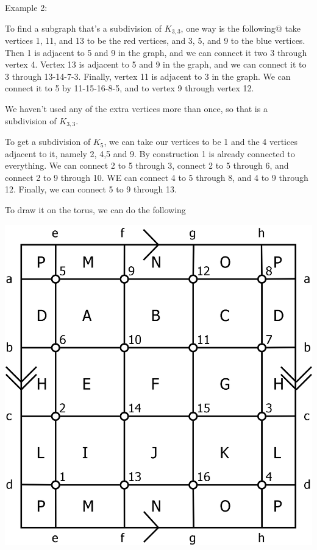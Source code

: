 \documentclass{amsart}
\begin{document}
Example 2:


To find a subgraph that's a subdivision of $K_{3,3}$, one way is the following@ take vertices 1, 11, and 13 to be the red vertices, and 3, 5, and 9 to the blue vertices.  Then 1 is adjacent to 5 and 9 in the graph, and we can connect it two 3 through vertex 4.  Vertex 13 is adjacent to 5 and 9 in the graph, and we can connect it to 3 through 13-14-7-3.  Finally, vertex 11 is adjacent to 3 in the graph.  We can connect it to 5 by 11-15-16-8-5, and to vertex 9 through vertex 12.

We haven't used any of the extra vertices more than once, so that is a subdivision of $K_{3,3}$.

To get a subdivision of $K_5$, we can take our vertices to be 1 and the 4 vertices adjacent to it, namely 2, 4,5 and 9.  By construction 1 is already connected to everything.  We can connect 2 to 5 through 3, connect 2 to 5 through 6, and connect 2 to 9 through 10.  WE can connect 4 to 5 through 8, and 4 to 9 through 12.  Finally, we can connect 5 to 9 through 13.








To draw it on the torus, we can do the following

\begin{center}
\includegraphics[width=\textwidth]{probbooksol36c.png}
\end{center}
\end{document}
